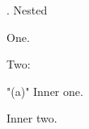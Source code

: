 
\document
{}. Nested\endhead
{}
\roster
\item One.
\item Two:
  \roster
  \item"(a)" Inner one.
  \item Inner two.
  \endroster
\endroster
\endproclaim
\enddocument
